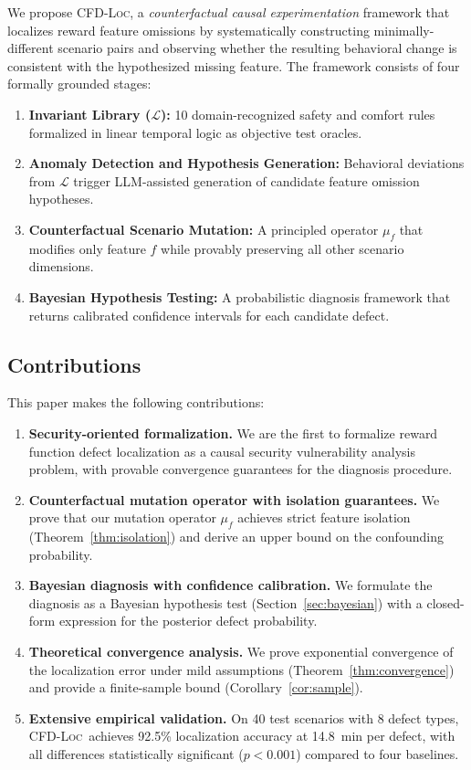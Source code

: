 \documentclass[journal]{IEEEtran}
\theoremstyle{plain}
\theoremstyle{definition}
\theoremstyle{remark}
\newcommand{\methodname}{\textsc{CFD-Loc}}
\newcommand{\invlib}{\mathcal{L}}
\begin{document}
We propose \methodname, a \emph{counterfactual causal experimentation} framework that localizes reward feature omissions by systematically constructing minimally-different scenario pairs and observing whether the resulting behavioral change is consistent with the hypothesized missing feature. The framework consists of four formally grounded stages:
\begin{enumerate}[nosep]
    \item \textbf{Invariant Library ($\invlib$):} 10 domain-recognized safety and comfort rules formalized in linear temporal logic as objective test oracles.
    \item \textbf{Anomaly Detection and Hypothesis Generation:} Behavioral deviations from $\invlib$ trigger LLM-assisted generation of candidate feature omission hypotheses.
    \item \textbf{Counterfactual Scenario Mutation:} A principled operator $\mu_f$ that modifies only feature $f$ while provably preserving all other scenario dimensions.
    \item \textbf{Bayesian Hypothesis Testing:} A probabilistic diagnosis framework that returns calibrated confidence intervals for each candidate defect.
\end{enumerate}

\subsection{Contributions}

This paper makes the following contributions:
\begin{enumerate}
    \item \textbf{Security-oriented formalization.} We are the first to formalize reward function defect localization as a causal security vulnerability analysis problem, with provable convergence guarantees for the diagnosis procedure.
    \item \textbf{Counterfactual mutation operator with isolation guarantees.} We prove that our mutation operator $\mu_f$ achieves strict feature isolation (Theorem~\ref{thm:isolation}) and derive an upper bound on the confounding probability.
    \item \textbf{Bayesian diagnosis with confidence calibration.} We formulate the diagnosis as a Bayesian hypothesis test (Section~\ref{sec:bayesian}) with a closed-form expression for the posterior defect probability.
    \item \textbf{Theoretical convergence analysis.} We prove exponential convergence of the localization error under mild assumptions (Theorem~\ref{thm:convergence}) and provide a finite-sample bound (Corollary~\ref{cor:sample}).
    \item \textbf{Extensive empirical validation.} On 40 test scenarios with 8 defect types, \methodname\ achieves 92.5\% localization accuracy at 14.8~min per defect, with all differences statistically significant ($p<0.001$) compared to four baselines.
\end{enumerate}
\end{document}

